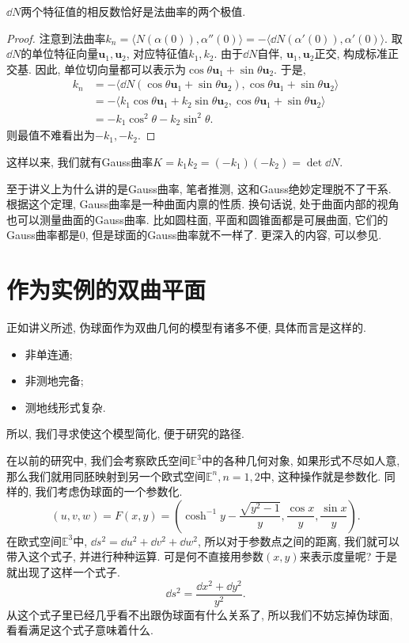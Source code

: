 \documentclass[./main.tex]{subfiles}
\begin{document}
\begin{proposition}
    \(\dd N\)两个特征值的相反数恰好是法曲率的两个极值.
\end{proposition}
\begin{proof}
    注意到法曲率\(k_n=\langle N(\alpha(0)),\alpha''(0)\rangle=-\langle \dd N(\alpha'(0)),\alpha'(0)\rangle\). 取\(\dd N\)的单位特征向量\(\mathbf{u}_1,\mathbf{u}_2\), 对应特征值\(k_1,k_2\). 由于\(\dd N\)自伴, \(\mathbf{u}_1,\mathbf{u}_2\)正交, 构成标准正交基. 因此, 单位切向量都可以表示为\(\cos\theta\mathbf{u}_1+\sin\theta\mathbf{u}_2\). 于是,
    \begin{align*}
        k_n&=-\langle\dd N(\cos\theta\mathbf{u}_1+\sin\theta\mathbf{u}_2),\cos\theta\mathbf{u}_1+\sin\theta\mathbf{u}_2\rangle\\
           &=-\langle k_1\cos\theta\mathbf{u}_1+k_2\sin\theta\mathbf{u}_2,\cos\theta\mathbf{u}_1+\sin\theta\mathbf{u}_2\rangle\\
           &=-k_1\cos^2\theta-k_2\sin^2\theta.
    \end{align*}
    则最值不难看出为\(-k_1,-k_2\).
\end{proof}
这样以来, 我们就有Gauss曲率\(K=k_1k_2=(-k_1)(-k_2)=\det\dd N\).

至于讲义上为什么讲的是Gauss曲率, 笔者推测, 这和Gauss绝妙定理脱不了干系. 根据这个定理, Gauss曲率是一种曲面内禀的性质. 换句话说, 处于曲面内部的视角也可以测量曲面的Gauss曲率. 比如圆柱面, 平面和圆锥面都是可展曲面, 它们的Gauss曲率都是\(0\), 但是球面的Gauss曲率就不一样了. 更深入的内容, 可以参见\cite{docarmo}.
\section{作为实例的双曲平面}
正如讲义所述, 伪球面作为双曲几何的模型有诸多不便, 具体而言是这样的.
\begin{itemize}
    \item 非单连通;
    \item 非测地完备;
    \item 测地线形式复杂.
\end{itemize}
所以, 我们寻求使这个模型简化, 便于研究的路径.

在以前的研究中, 我们会考察欧氏空间\(\mathbb{E}^3\)中的各种几何对象, 如果形式不尽如人意, 那么我们就用同胚映射到另一个欧式空间\(\mathbb{E}^n,n=1,2\)中, 这种操作就是参数化. 同样的, 我们考虑伪球面的一个参数化.
\[
    (u,v,w)=F(x,y)=\left(\cosh^{-1}y-\frac{\sqrt{y^2-1}}{y},\frac{\cos x}{y},\frac{\sin x}{y}\right).
\]
在欧式空间\(\mathbb{E}^3\)中, \(\dd s^2=\dd u^2+\dd v^2+\dd w^2\), 所以对于参数点之间的距离, 我们就可以带入这个式子, 并进行种种运算. 可是何不直接用参数\((x,y)\)来表示度量呢? 于是就出现了这样一个式子.
\begin{equation}\label{equ:3}
    \dd s^2=\frac{\dd x^2+\dd y^2}{y^2}.
\end{equation}
从这个式子里已经几乎看不出跟伪球面有什么关系了, 所以我们不妨忘掉伪球面, 看看满足这个式子意味着什么.
\end{document}
